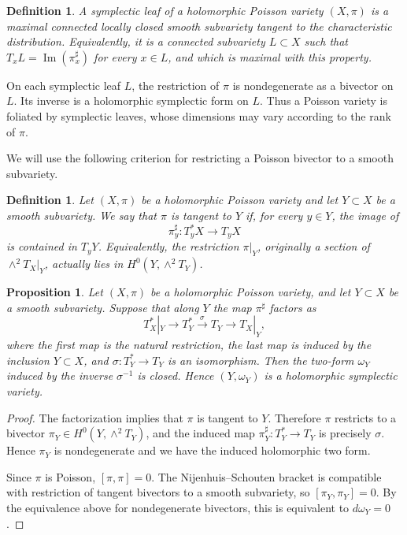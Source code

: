 \documentclass[11pt]{amsart}
\theoremstyle{plain}
\newtheorem{definition}[theorem]{Definition}
\newtheorem{prop}[theorem]{Proposition}
\theoremstyle{definition}
\theoremstyle{remark}
\begin{document}
\begin{definition}
A symplectic leaf of a holomorphic Poisson variety $(X,\pi)$ is a maximal connected locally closed smooth subvariety tangent to the characteristic distribution. Equivalently, it is a connected subvariety $L\subset X$ such that $T_xL=\operatorname{Im}(\pi_x^\sharp)$
for every $x\in L$, and which is maximal with this property.
\end{definition}

On each symplectic leaf $L$, the restriction of $\pi$ is nondegenerate as a bivector on $L$. Its inverse is a holomorphic symplectic form on $L$. Thus a Poisson variety is foliated by symplectic leaves, whose dimensions may vary according to the rank of $\pi$.

We will use the following criterion for restricting a Poisson bivector to a smooth subvariety.

\begin{definition}
Let $(X,\pi)$ be a holomorphic Poisson variety and let $Y\subset X$ be a smooth subvariety. We say that $\pi$ is tangent to $Y$ if, for every $y\in Y$, the image of
\[
\pi_y^\sharp:T_y^*X\to T_yX
\]
is contained in $T_yY$. Equivalently, the restriction $\pi|_Y$, originally a section of $\wedge^2T_X|_Y$, actually lies in $H^0(Y,\wedge^2T_Y)$.
\end{definition}

\begin{prop}\label{prop:symp leaf closed}
Let $(X,\pi)$ be a holomorphic Poisson variety, and let $Y\subset X$ be a smooth subvariety. Suppose that along $Y$ the map $\pi^\sharp$ factors as
\[
T_X^*|_Y
\longrightarrow
T_Y^*
\xrightarrow{\ \sigma\ }
T_Y
\longrightarrow
T_X|_Y,
\]
where the first map is the natural restriction, the last map is induced by the inclusion $Y\subset X$, and $\sigma:T_Y^*\to T_Y$ is an isomorphism. Then the two-form $\omega_Y$ induced by the inverse $\sigma^{-1}$ is closed. Hence $(Y,\omega_Y)$ is a holomorphic symplectic variety.
\end{prop}

\begin{proof}
The factorization implies that $\pi$ is tangent to $Y$. Therefore $\pi$ restricts to a bivector $\pi_Y\in H^0(Y,\wedge^2T_Y)$, and the induced map $\pi_Y^\sharp:T_Y^*\to T_Y$ is precisely $\sigma$. Hence $\pi_Y$ is nondegenerate and we have the induced holomorphic two form. 

Since $\pi$ is Poisson, $[\pi,\pi]=0$. The Nijenhuis--Schouten bracket is compatible with restriction of tangent bivectors to a smooth subvariety, so $[\pi_Y,\pi_Y]=0$. By the equivalence above for nondegenerate bivectors, this is equivalent to $d\omega_Y=0$.
\end{proof}
\end{document}
